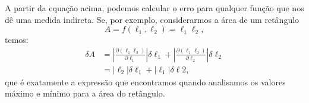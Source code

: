 A partir da equação acima, podemos calcular o erro para qualquer função que nos dê uma medida indireta. Se, por exemplo, considerarmos a área de um retângulo
\begin{equation}
    A = f(\ell_1,\ell_2)=\ell_1\ell_2,
\end{equation}
%
temos:
\begin{align}
	\delta A &= \left|\frac{\partial(\ell_1\ell_2)}{\partial \ell_1}\right|\delta \ell_1 + \left|\frac{\partial (\ell_1\ell_2)}{\partial \ell_2}\right|\delta \ell_2 \\
	&= |\ell_2|\delta \ell_1 + |\ell_1|\delta \ell2,
\end{align}
%
que é exatamente a expressão que encontramos quando analisamos os valores máximo e mínimo para a área do retângulo. 





